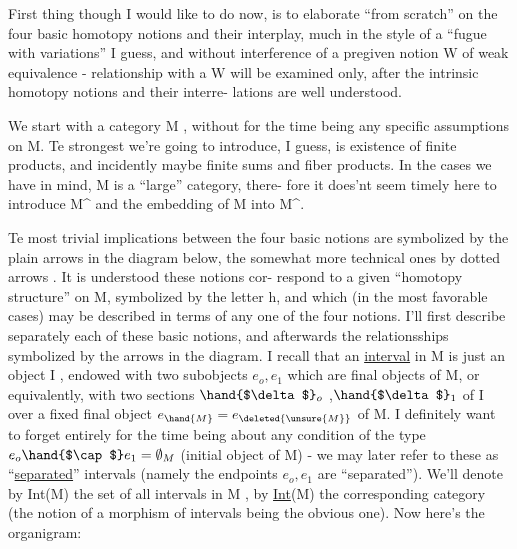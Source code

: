 
 First thing though I would like to do now,  is to elaborate ``from
scratch'' on the four basic homotopy notions and their interplay,  much in
the style of a ``fugue with variations'' I guess,  and without interference
of a pregiven notion W of weak equivalence  -  relationship with a W will
be examined only,  after the intrinsic homotopy notions and their interre-%
lations are well understood.

We start with a category M ,  without for the time being any specific
assumptions on M.  Te strongest we're going to introduce,  I guess,  is
existence of finite products,  and incidently maybe finite sums and fiber
products.  In the cases we have in mind,  M is a ``large'' category,  there-%
fore it does'nt seem timely here to introduce M\^{} and the embedding of M
into M\^{}.

Te most trivial implications between the four basic  notions are
symbolized by the plain arrows in the diagram below,  the somewhat more
technic\hand{$\frown$}al ones by dotted arrows \hand{*}.  It is understood these notions cor-%
respond to a given ``homotopy structure'' on M,  symbolized by the letter h,
and which (in  the most favorable cases)  may be described  in terms of any
one of the four notions.  I'll first describe separately each of these
basic notions,  and afterwards the relationsships  symbolized by
the arrows in the diagram.  I recall that an \uline{interval} in M is just an
object  I ,  endowed with two subobjects $e_o,e_1$ which are final objects of
M,  or equivalently,  with two sections $\hand{$\delta$}_o$ ,$\hand{$\delta$}_1$ of I over a fixed final
object $e_{\hand{M}}=e_{\deleted{\unsure{M}}}$ of M.  I definitely want to forget entirely for the time being
about any condition of the type $e_o\hand{$\cap$}e_1 = \emptyset_M$  (initial object of M)  -
we may later refer to these as ``\uline{separated}'' intervals (namely the endpoints
$e_o,e_1$ are ``separated'').  We'll denote by Int(M) the set of all intervals
in M ,  by \uline{Int}(M) the corresponding category (the notion of a morphism of
\margin{\unsure{$\llcorner$}}intervals being the obvious one).  Now here's the organigram:

